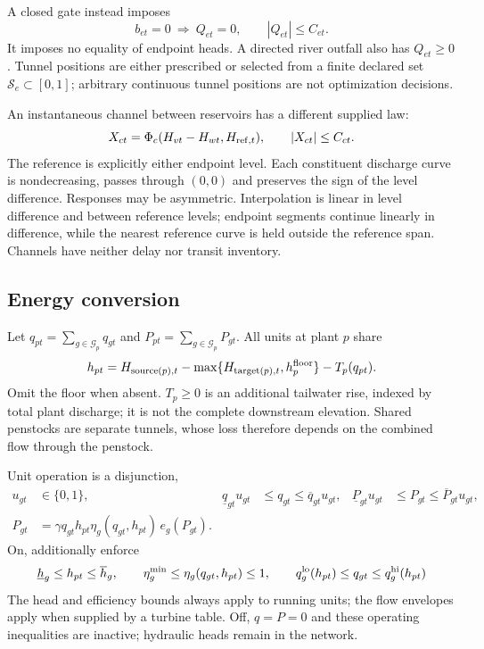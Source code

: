 \documentclass[10pt,a4paper]{article}
\begin{document}
A closed gate instead imposes
\begin{equation}
b_{et}=0\ \Longrightarrow\ Q_{et}=0,\qquad
|Q_{et}|\le C_{et}.
\label{eq:closed}
\end{equation}
It imposes no equality of endpoint heads. A directed river outfall also has
$Q_{et}\ge0$. Tunnel positions are either prescribed or selected from a
finite declared set $\mathcal S_e\subset[0,1]$; arbitrary continuous tunnel
positions are not optimization decisions.

An instantaneous channel between reservoirs has a different supplied law:
\begin{equation}
X_{ct}=\Phi_c(H_{vt}-H_{wt},H_{{\rm ref},t}),\qquad
|X_{ct}|\le C_{ct}.
\label{eq:channel}
\end{equation}
The reference is explicitly either endpoint level. Each constituent
discharge curve is nondecreasing, passes through $(0,0)$ and preserves the
sign of the level difference. Responses may be asymmetric. Interpolation is
linear in level difference and between reference levels; endpoint segments
continue linearly in difference, while the nearest reference curve is held
outside the reference span. Channels have neither delay nor transit inventory.

\subsection{Energy conversion}

Let $q_{pt}=\sum_{g\in\mathcal G_p}q_{gt}$ and
$P_{pt}=\sum_{g\in\mathcal G_p}P_{gt}$. All units at plant $p$ share
\begin{equation}
h_{pt}=H_{{\rm source}(p),t}
       -\max\{H_{{\rm target}(p),t},h_p^{\rm floor}\}
       -T_p(q_{pt}).
\label{eq:nethead}
\end{equation}
Omit the floor when absent. $T_p\ge0$ is an additional tailwater rise, indexed
by total plant discharge; it is not the complete downstream elevation.
Shared penstocks are separate tunnels, whose loss therefore depends on the
combined flow through the penstock.

Unit operation is a disjunction,
\begin{align}
u_{gt}&\in\{0,1\},&
\underline q_{gt}u_{gt}&\le q_{gt}\le\overline q_{gt}u_{gt},&
\underline P_{gt}u_{gt}&\le P_{gt}\le\overline P_{gt}u_{gt}, \label{eq:onoff}\\
P_{gt}&=\gamma q_{gt}h_{pt}
          \eta_g(q_{gt},h_{pt})\,e_g(P_{gt}).&&&& \label{eq:power}
\end{align}
On, additionally enforce
\begin{equation}
\underline h_g\le h_{pt}\le\overline h_g,\qquad
\eta_g^{\min}\le\eta_g(q_{gt},h_{pt})\le1,\qquad
q_g^{\rm lo}(h_{pt})\le q_{gt}\le q_g^{\rm hi}(h_{pt})
\label{eq:unitdomain}
\end{equation}
The head and efficiency bounds always apply to running units; the flow
envelopes apply when supplied by a turbine table. Off, $q=P=0$ and these
operating inequalities are inactive; hydraulic heads remain in the network.
\end{document}
